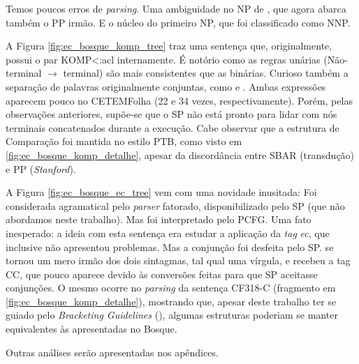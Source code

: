 Temos poucos erros de \textit{parsing}. Uma ambiguidade no NP de , que agora abarca também o PP irmão. E o núcleo do primeiro NP, que foi classificado como NNP.

\begin{center}
    
\end{center}
A Figura \ref{fig:ec_bosque_komp_tree} traz uma sentença que, originalmente, possui o par KOMP<:acl internamente. É notório como as regras unárias (Não-terminal $\rightarrow$ terminal) são mais consistentes que as binárias. Curioso também a separação de palavras originalmente conjuntas, como  e . Ambas expressões aparecem pouco no CETEMFolha (22 e 34 vezes, respectivamente). Porém, pelas observações anteriores, supõe-se que o SP não está pronto para lidar com nós terminais concatenados durante a execução. Cabe observar que a estrutura de Comparação foi mantida no estilo PTB, como visto em \ref{fig:ec_bosque_komp_detalhe}, apesar da discordância entre SBAR (transdução) e PP (\textit{Stanford}).

\begin{center}
    
\end{center}
A Figura \ref{fig:ec_bosque_ec_tree} vem com uma novidade inusitada: Foi considerada agramatical pelo \textit{parser} fatorado, disponibilizado pelo SP (que não abordamos neste trabalho). Mas foi interpretado pelo PCFG. Uma fato inesperado: a ideia com esta sentença era estudar a aplicação da \textit{tag} \textit{ec}, que inclusive não apresentou problemas. Mas a conjunção  foi desfeita pelo SP.  se tornou um mero irmão dos dois sintagmas, tal qual uma vírgula, e recebeu a tag CC, que pouco aparece devido às conversões feitas para que SP aceitasse conjunções. O mesmo ocorre no \textit{parsing} da sentença CF318-C (fragmento em \ref{fig:ec_bosque_komp_detalhe}), mostrando que, apesar deste trabalho ter se guiado pelo \textit{Bracketing Guidelines} (), algumas estruturas poderiam se manter equivalentes às apresentadas no Bosque.

Outras análises serão apresentadas nos apêndices.